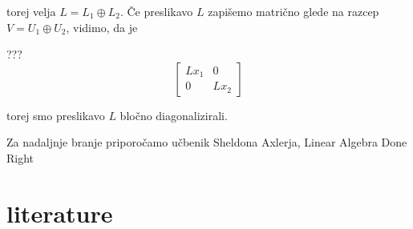 \documentclass[a4paper,12pt]{article}
\theoremstyle{definition}
\begin{document}
torej velja $L = L_1 \oplus L_2$.
Če preslikavo $L$ zapišemo matrično glede na razcep $V = U_1 \oplus U_2$, vidimo, da je

???
\[
\begin{bmatrix}
Lx_1 &0\\
0& Lx_2
\end{bmatrix}
\]

torej smo preslikavo $L$ bločno diagonalizirali.

Za nadaljnje branje priporočamo učbenik Sheldona Axlerja, Linear Algebra Done Right \cite{axler}
\section*{literature}
\end{document}
